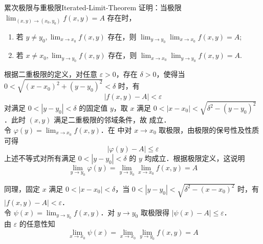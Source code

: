 \begin{problem}{累次极限与重极限}{Iterated-Limit-Theorem}
    证明：当极限 $ \lim_{(x,y) \to (x_0, y_0)} f(x,y) = A$ 存在时，
    \begin{enumerate}
        \item 若 $y \neq y_0,  \lim_{x \to x_0} f(x,y)$ 存在，则 $ \lim_{y \to y_0} \lim_{x \to x_0} f(x,y) = A$;
        \item 若 $x \neq x_0,  \lim_{y \to y_0} f(x,y)$ 存在，则 $ \lim_{x \to x_0} \lim_{y \to y_0} f(x,y) = A$.
    \end{enumerate}
\end{problem}

\begin{myproof}

    根据二重极限的定义，对任意 $\varepsilon > 0$，存在 $\delta > 0$，使得当 $0 < \sqrt{(x-x_0)^2 + (y-y_0)^2} < \delta$ 时，有
    \begin{equation} \label{eq:limit-def-1}
        |f(x,y) - A| < \varepsilon
    \end{equation}
    对满足 $0 < |y - y_0| < \delta$ 的固定值 $y$，取 $x$ 满足 $0 < |x - x_0| < \sqrt{\delta^2 - (y-y_0)^2}$．此时 $(x,y)$ 满足二重极限的邻域条件，故  成立．\\
    令 $\varphi(y) =  \lim_{x \to x_0} f(x,y)$．在  中对 $x \to x_0$ 取极限，由极限的保号性及性质可得
    \begin{equation}
        |\varphi(y) - A| \le \varepsilon
    \end{equation}
    上述不等式对所有满足 $0 < |y - y_0| < \delta$ 的 $y$ 均成立．根据极限定义，这说明
    \begin{equation}
        \lim_{y \to y_0} \varphi(y) = \lim_{y \to y_0} \lim_{x \to x_0} f(x,y) = A
    \end{equation}


    同理，固定 $x$ 满足 $0 < |x - x_0| < \delta$，当 $0 < |y - y_0| < \sqrt{\delta^2 - (x-x_0)^2}$ 时，有 $|f(x,y) - A| < \varepsilon$．\\
    令 $\psi(x) =  \lim_{y \to y_0} f(x,y)$．对 $y \to y_0$ 取极限得 $|\psi(x) - A| \le \varepsilon$．\\
    由 $\varepsilon$ 的任意性知
    \begin{equation}
        \lim_{x \to x_0} \psi(x) = \lim_{x \to x_0} \lim_{y \to y_0} f(x,y) = A
    \end{equation}
\end{myproof}


